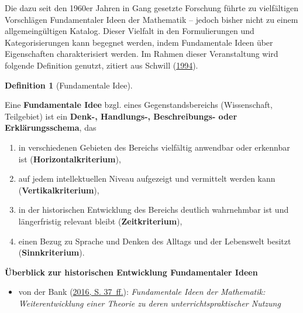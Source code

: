 \documentclass[
]{scrbook}
\providecommand{\tightlist}{%
  \setlength{\itemsep}{0pt}\setlength{\parskip}{0pt}}
\renewenvironment{quote}{
  \list{}{
	\leftmargin0.2cm   %
    \rightmargin\leftmargin
      	\def\FrameCommand
    {%
        {\color{quoteColor}\vrule width 2pt}%
        \hspace{0pt}%
    }%
    \MakeFramed{\advance \hsize -\width \FrameRestore}    \color{quoteColor}
    }
  \item\relax
}
{\endlist\color{black}\endMakeFramed}
\theoremstyle{definition}
\newtheorem{definition}{Definition}[chapter]
\theoremstyle{definition}
\theoremstyle{definition}
\theoremstyle{definition}
\theoremstyle{remark}
\begin{document}
Die dazu seit den 1960er Jahren in Gang gesetzte Forschung führte zu vielfältigen Vorschlägen Fundamentaler Ideen der Mathematik -- jedoch bisher nicht zu einem allgemeingültigen Katalog. Dieser Vielfalt in den Formulierungen und Kategorisierungen kann begegnet werden, indem Fundamentale Ideen über Eigenschaften charakterisiert werden. Im Rahmen dieser Veranstaltung wird folgende Definition genutzt, zitiert aus Schwill (\protect\hyperlink{ref-Schwill:1994}{1994}).

\begin{definition}[Fundamentale Idee]
\protect\hypertarget{def:FundamentaleIdee}{}\label{def:FundamentaleIdee}

Eine \textbf{Fundamentale Idee} bzgl. eines Gegenstandsbereichs (Wissenschaft, Teilgebiet) ist ein \textbf{Denk-, Handlungs-, Beschreibungs- oder Erklärungsschema}, das

\begin{enumerate}
\def\labelenumi{\arabic{enumi}.}
\tightlist
\item
  in verschiedenen Gebieten des Bereichs vielfältig anwendbar oder erkennbar ist (\textbf{Horizontalkriterium}),
\item
  auf jedem intellektuellen Niveau aufgezeigt und vermittelt werden kann (\textbf{Vertikalkriterium}),
\item
  in der historischen Entwicklung des Bereichs deutlich wahrnehmbar ist und längerfristig relevant bleibt (\textbf{Zeitkriterium}),
\item
  einen Bezug zu Sprache und Denken des Alltags und der Lebenswelt besitzt (\textbf{Sinnkriterium}).
\end{enumerate}

\end{definition}

\begin{quote}
\textbf{Überblick zur historischen Entwicklung Fundamentaler Ideen}

\begin{itemize}
\tightlist
\item
  von der Bank (\protect\hyperlink{ref-Bank:2016}{2016, S. 37~ff.}): \emph{Fundamentale Ideen der Mathematik: Weiterentwicklung einer Theorie zu deren unterrichtspraktischer Nutzung}
\end{itemize}
\end{quote}
\end{document}
